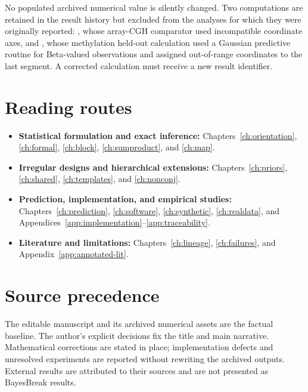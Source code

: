 \begin{exclusionbox}
No populated archived numerical value is silently changed. Two computations are retained in the
result history but excluded from the analyses for which they were originally reported:
, whose array-CGH comparator used incompatible coordinate axes, and
, whose methylation held-out calculation used a Gaussian predictive
routine for Beta-valued observations and assigned out-of-range coordinates to the last segment.
A corrected calculation must receive a new result identifier.
\end{exclusionbox}

\section*{Reading routes}
\begin{itemize}
\item \textbf{Statistical formulation and exact inference:} Chapters~\ref{ch:orientation},
\ref{ch:formal}, \ref{ch:block}, \ref{ch:sumproduct}, and \ref{ch:map}.
\item \textbf{Irregular designs and hierarchical extensions:} Chapters~\ref{ch:priors},
\ref{ch:shared}, \ref{ch:templates}, and \ref{ch:nonconj}.
\item \textbf{Prediction, implementation, and empirical studies:} Chapters~\ref{ch:prediction},
\ref{ch:software}, \ref{ch:synthetic}, \ref{ch:realdata}, and
Appendices~\ref{app:implementation}--\ref{app:traceability}.
\item \textbf{Literature and limitations:} Chapters~\ref{ch:lineage}, \ref{ch:failures}, and
Appendix~\ref{app:annotated-lit}.
\end{itemize}

\section*{Source precedence}
The editable manuscript and its archived numerical assets are the factual baseline. The author's
explicit decisions fix the title and main narrative. Mathematical corrections are stated in place;
implementation defects and unresolved experiments are reported without rewriting the archived
outputs. External results are attributed to their sources and are not presented as BayesBreak
results.
